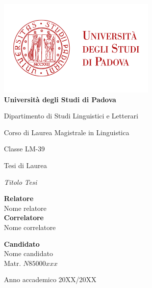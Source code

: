 \documentclass[12pt,a4paper,twoside,openright]{book}
\begin{document}
\begin{titlepage}
\begin{center}
 
\includegraphics[scale=.45]{logo.png}
\\
\vspace{1cm}
\textbf{\Large Università degli Studi di Padova}

\vspace{0.5cm}
 
\begin{Large}
	Dipartimento di Studi Linguistici e Letterari
	\vspace{1.5cm} 

	Corso di Laurea Magistrale in Linguistica

	Classe LM-39
	\vspace{1.5cm} 
\end{Large} 


Tesi di Laurea


\vspace{3cm}

\begin{Huge}
\doublespacing  \textit{Titolo Tesi}
\end{Huge}


\vspace{2.5cm}

\vspace{3.5cm}
\par
\noindent
\begin{minipage}[t]{0.47\textwidth}
	\textbf{Relatore}\\
	Nome relatore\\    %
	\textbf{Correlatore}\\
	Nome correlatore
\end{minipage}
\hfill
\begin{minipage}[t]{0.47\textwidth}\raggedleft
	\textbf{Candidato}\\
	Nome candidato\\ %
	Matr. $N85000xxx$ 
\end{minipage}
\vspace{5.5mm}


\vfill


{\small Anno accademico 20XX/20XX} 

\clearpage

\end{center}
\end{titlepage}
\end{document}

